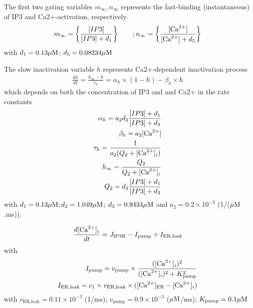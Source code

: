 The first two gating variables $m_\infty, n_\infty$ represents the fast-binding
(instantaneous) of IP3 and Ca2+-activation, respectively.
\begin{equation}
m_\infty = \left\{ \frac{[IP3]}{[IP3] + d_1} \right\} \qquad; n_\infty = \left\{
\frac{[{\text{Ca}^{2+}}]}{[{\text{Ca}^{2+}}] + d_5} \right\}
\end{equation}
with $d_1=0.13{\mu\text{M}}$; $d_5=0.08234{\mu\text{M}}$

The slow inactivation
variable $h$ represents Ca2+-dependent inactivation process
\begin{equation}
\begin{split}
\frac{dh}{dt} = \frac{h_\infty - h}{\tau_h} = \alpha_h \times (1-h) - \beta_h
\times h
\end{split}
\end{equation}
which depends on both the concentration of IP3 and and Ca2+ in the rate
constants
\begin{equation}
\begin{split}
\alpha_h = a_2 d_2 \frac{[IP3] + d_1}{[IP3] + d_3} \\
\beta_h = a_2 [{\text{Ca}^{2+}}] \\
\tau_h = \frac{1}{a_2 (Q_2 + [{\text{Ca}^{2+}}]_i)} \\
h_\infty = \frac{Q_2}{Q_2 + [{\text{Ca}^{2+}}]_i} \\
Q_2 = d_2 \frac{[IP3] + d_1}{[IP3] + d_3}
\end{split}
\end{equation}
with $d_1=0.13{\mu\text{M}}; d_2=1.049{\mu\text{M}}$; $d_3=0.9434{\mu\text{M}}$%
and $a_2 = 0.2\times 10^{-3}$ (1/(${\mu\text{M}}$.ms)).

\begin{equation}
\frac{d[{\text{Ca}^{2+}}]_i}{dt}  = J_\text{IP3R} - I_\text{pump} + I_\text{ER,leak}
\end{equation}
with 
\def\pump{{\text{pump}}}
\begin{equation}
\begin{split}
I_\text{pump} = v_\text{pump} \times \frac{([\Ca]_i)^2}{([\Ca]_i)^2 + K_\pump^2}
\\
I_\text{ER,leak} = c_1 \times v_{\text{ER,leak}} \times ([\Ca]_\er - [\Ca]_i)
\end{split}
\end{equation}
with $v_\text{ER,leak}=0.11\times 10^{-3}$ (1/ms); 
$v_\pump=0.9\times 10^{-3}$
(${\mu\text{M}}$/ms); $K_\pump = 0.1 \muM$


